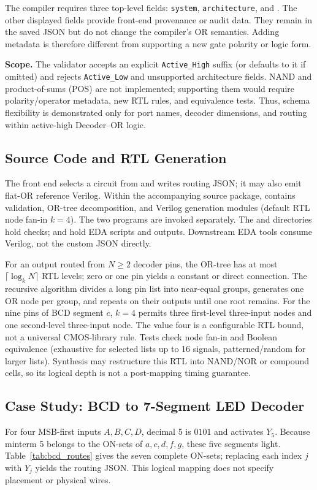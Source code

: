 \documentclass[runningheads]{llncs}
\begin{document}
The compiler requires three top-level fields: \texttt{system}, \texttt{architecture}, and . The other displayed fields provide front-end provenance or audit data. They remain in the saved JSON but do not change the compiler's OR semantics. Adding metadata is therefore different from supporting a new gate polarity or logic form.

\textbf{Scope.} The validator accepts an explicit \texttt{Active\_High} suffix (or defaults to it if omitted) and rejects \texttt{Active\_Low} and unsupported architecture fields. NAND and product-of-sums (POS) are not implemented; supporting them would require polarity/operator metadata, new RTL rules, and equivalence tests. Thus, schema flexibility is demonstrated only for port names, decoder dimensions, and routing within active-high Decoder--OR logic.

\subsection{Source Code and RTL Generation}
The front end  selects a circuit from  and writes routing JSON; it may also emit flat-OR reference Verilog. Within the accompanying source package,  contains validation, OR-tree decomposition, and Verilog generation modules (default RTL node fan-in $k=4$). The two programs are invoked separately. The  and  directories hold checks;  and  hold EDA scripts and outputs. Downstream EDA tools consume Verilog, not the custom JSON directly.

For an output routed from $N\geq2$ decoder pins, the OR-tree has at most $\lceil\log_kN\rceil$ RTL levels; zero or one pin yields a constant or direct connection. The recursive algorithm divides a long pin list into near-equal groups, generates one OR node per group, and repeats on their outputs until one root remains. For the nine pins of BCD segment $c$, $k=4$ permits three first-level three-input nodes and one second-level three-input node. The value four is a configurable RTL bound, not a universal CMOS-library rule. Tests check node fan-in and Boolean equivalence (exhaustive for selected lists up to 16 signals, patterned/random for larger lists). Synthesis may restructure this RTL into NAND/NOR or compound cells, so its logical depth is not a post-mapping timing guarantee.

\subsection{Case Study: BCD to 7-Segment LED Decoder}
For four MSB-first inputs $A,B,C,D$, decimal 5 is $0101$ and activates $Y_5$. Because minterm 5 belongs to the ON-sets of $a,c,d,f,g$, these five segments light. Table~\ref{tab:bcd_routes} gives the seven complete ON-sets; replacing each index $j$ with $Y_j$ yields the routing JSON. This logical mapping does not specify placement or physical wires.
\end{document}
